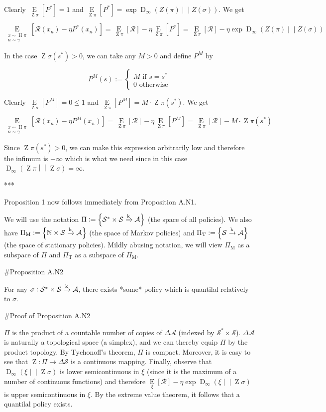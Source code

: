 \documentclass[a4paper]{article}
\newcommand{\AP}[1]{\left(#1\right)}
\newcommand{\AB}[1]{\left[#1\right]}
\newcommand{\AC}[1]{\left\{#1\right\}}
\newcommand{\Ea}[2]{\underset{#1}{\operatorname{E}}\AB{#2}}
\newcommand{\RD}[3]{\operatorname{D}_{#1}\AP{#2\middle\vert\middle\vert#3}}
\newcommand{\Nats}{\mathbb{N}}
\newcommand{\K}{\xrightarrow{\textnormal{k}}}
\newcommand{\A}{\mathcal{A}}
\newcommand{\St}{\mathcal{S}}
\newcommand{\R}{\mathcal{R}}
\newcommand{\Pe}{P}
\DeclareMathOperator{\Hi}{H}
\DeclareMathOperator{\Z}{Z}
\begin{document}
Clearly $\Ea{\Z{\sigma}}{\Pe^*} = 1$ and $\Ea{\Z{\pi}}{P^*} = \exp{\RD{\infty}{Z(\pi)}{Z(\sigma)}}$. We get

$$\Ea{\substack{x\sim\Hi{\pi}\\n\sim\gamma}}{\R\AP{x_n}-\eta\Pe^*\AP{x_n}} = \Ea{\Z{\pi}}{\R} - \eta \Ea{\Z{\pi}}{\Pe^*} = \Ea{\Z{\pi}}{\R} - \eta\exp{\RD{\infty}{Z(\pi)}{Z(\sigma)}}$$

In the case $\Z{\sigma}\AP{s^*} > 0$, we can take any $M > 0$ and define $\Pe^M$ by

$$\Pe^M(s):=\begin{cases} M \text{ if } s=s^* \\ 0 \text{ otherwise} \end{cases}$$

Clearly $\Ea{\Z{\sigma}}{\Pe^M} = 0 \leq 1$ and $\Ea{\Z{\pi}}{P^M} = M \cdot \Z{\pi}\AP{s^*}$. We get

$$\Ea{\substack{x\sim\Hi{\pi}\\n\sim\gamma}}{\R\AP{x_n}-\eta\Pe^M\AP{x_n}} = \Ea{\Z{\pi}}{\R} - \eta \Ea{\Z{\pi}}{\Pe^M} = \Ea{\Z{\pi}}{\R} - M \cdot \Z{\pi}\AP{s^*}$$

Since $\Z{\pi}\AP{s^*} > 0$, we can make this expression arbitrarily low and therefore the infimum is $-\infty$ which is what we need since in this case $\RD{\infty}{\Z{\pi}}{\Z{\sigma}} = \infty$.

***

Proposition 1 now follows immediately from Proposition A.N1.

We will use the notation $\Pi:=\AC{\St^* \times \St \K \A}$ (the space of all policies). We also have $\Pi_{\text{M}}:=\AC{\Nats \times \St \K \A}$ (the space of Markov policies) and $\Pi_{\text{T}}:=\AC{ \St \K \A}$ (the space of stationary policies). Mildly abusing notation, we will view $\Pi_{\text{M}}$ as a subspace of $\Pi$ and $\Pi_{\text{T}}$ as a subspace of $\Pi_{\text{M}}$.

\#Proposition A.N2

For any $\sigma: \St^* \times \St \K \A$, there exists *some* policy which is quantilal relatively to $\sigma$.

\#Proof of Proposition A.N2

$\Pi$ is the product of a countable number of copies of $\Delta\A$ (indexed by $\St^* \times \St$). $\Delta\A$ is naturally a topological space (a simplex), and we can thereby equip $\Pi$ by the product topology. By Tychonoff's theorem, $\Pi$ is compact. Moreover, it is easy to see that $\Z: \Pi \rightarrow \Delta\St$ is a continuous mapping. Finally, observe that $\RD{\infty}{\xi}{\Z{\sigma}}$ is lower semicontinuous in $\xi$ (since it is the maximum of a number of continuous functions) and therefore $\Ea{\xi}{\R} - \eta\exp{\RD{\infty}{\xi}{\Z{\sigma}}}$ is upper semicontinuous in $\xi$. By the extreme value theorem, it follows that a quantilal policy exists.
\end{document}
